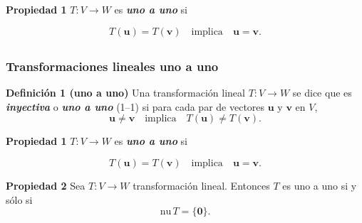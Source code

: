 {\begin{frame}
\vspace{-1mm}
\begin{prop}{\textbf{Propiedad 1}}
	\justifying
	$T:V\to W$ es \textbf{\textit{uno a uno}} si 
	
	\vspace{-2mm}
	\[
	T(\mathbf{u}) = T(\mathbf{v}) \quad \text{implica} \quad \mathbf{u} = \mathbf{v}.
	\]
\end{prop}	

\end{frame}
}


\subsection{}

{\nologo 
\begin{frame}\frametitle{Transformaciones lineales uno a uno}

\begin{block}{\textbf{Definición 1 (uno a uno) }}
	\justifying
	Una transformación lineal $T:V\to W$ se dice que es \textbf{\textit{inyectiva}} o \textbf{\textit{uno a uno}} (1--1) si
	para cada par de vectores $\mathbf{u}$ y $\mathbf{v}$ en $V$,
	\[
	\mathbf{u}\neq \mathbf{v} \quad \text{implica} \quad T(\mathbf{u})\neq T(\mathbf{v}).
	\]
\end{block}

\begin{prop}{\textbf{Propiedad 1}}
	\justifying
	$T:V\to W$ es \textbf{\textit{uno a uno}} si 
	
	\vspace{-2mm}
	\[
	T(\mathbf{u}) = T(\mathbf{v}) \quad \text{implica} \quad \mathbf{u} = \mathbf{v}.
	\]
\end{prop}	

\begin{prop}{\textbf{Propiedad 2}}
	\justifying
	Sea $T:V\to W$ transformación lineal. Entonces $T$ es uno a uno si y sólo si 
	\[
	\text{nu}\,T=\{\mathbf{0}\}.
	\]
\end{prop}	

\end{frame}
}


\subsection{}

